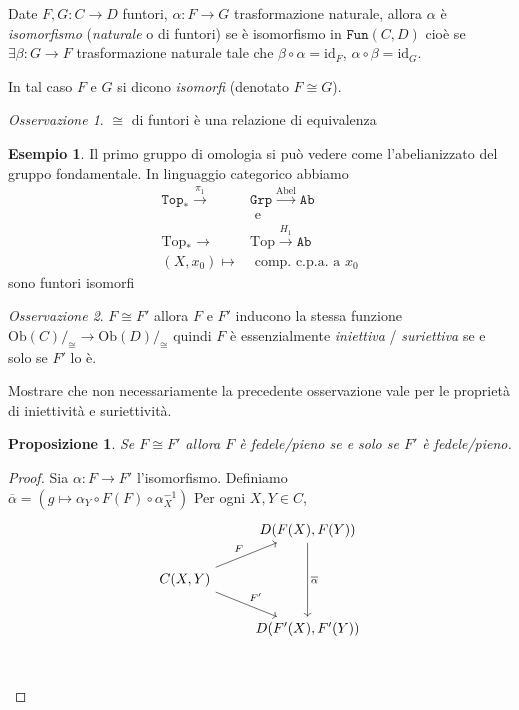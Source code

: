 \documentclass[notitlepage]{report}
\newcounter{theo}[section]\setcounter{theo}{0}
\newcounter{excounter}[section]\setcounter{excounter}{0}
\numberwithin{equation}{section}
\theoremstyle{plain}
\newtheorem{proposition}[theo]{Proposizione}
\theoremstyle{definition}
\newtheorem{example}[excounter]{Esempio}
\theoremstyle{remark}
\newtheorem*{remark}{Osservazione}
\begin{document}
\begin{definition}{}
    Date \(F, G : C \to D\) funtori, \(\alpha : F \to G\) trasformazione
    naturale, allora \(\alpha\) è \emph{isomorfismo} (\emph{naturale} o di funtori) se è isomorfismo in \(\mathtt{Fun}{(C, D)}\) cioè se 
    \(\exists \beta : G \to F\) trasformazione naturale tale che \(\beta \circ
    \alpha = \mathrm{id}_F\), \(\alpha \circ \beta = \mathrm{id}_G\).

    In tal caso \(F\) e \(G\) si dicono \emph{isomorfi} (denotato \(F \cong
    G\)).
\end{definition}
\begin{remark}{}
    \(\cong\) di funtori è una relazione di equivalenza 
\end{remark}
\begin{example}{}

Il primo gruppo di omologia si può vedere come l'abelianizzato del gruppo
fondamentale. In linguaggio categorico abbiamo 
\begin{align*}
  \mathtt{Top_*} \overset{\pi_{1}}{\to } &\mathtt{Grp} \overset{\mathrm{Abel}}{\to } \mathtt{Ab} \\ 
  &\text{ e } \\
  \mathrm{Top_*} \to &\mathrm{Top} \overset{H_{1}}{\to } \mathtt{Ab} \\
  {(X, x_{0})} \mapsto &\text{ comp. c.p.a. a \(x_{0}\)}
\end{align*}
sono funtori isomorfi
\end{example}

\begin{remark}{}
    \(F \cong F'\) allora \(F\) e \(F'\) inducono la stessa funzione \(\mathrm{Ob}{(C)} /_{\cong} \to \mathrm{Ob}{(D)}/_{\cong}\) quindi \(F\) è essenzialmente 
   \emph{iniettiva} / \emph{suriettiva} se e solo se \(F'\) lo è.
\end{remark}

\begin{eser}{}
    Mostrare che non necessariamente la precedente osservazione vale per le
    proprietà di iniettività e suriettività.
\end{eser}

\begin{proposition}{}
    Se \(F \cong F'\) allora \(F\) è \emph{fedele}/\emph{pieno} se e solo se \(F'\) è \emph{fedele}/\emph{pieno}.
\end{proposition}
\begin{proof}{}
    Sia \(\alpha : F \to F'\) l'isomorfismo. Definiamo \\\(\overline{\alpha} = {(g \mapsto \alpha_Y \circ F{(F)} \circ \alpha_X^{-1})}\) 
    Per ogni \(X, Y \in C\),
\[\begin{tikzcd}
	& {D(F(X),F(Y))} \\
	{C(X,Y)} \\
	& {D(F'(X),F'(Y))} \\
	\arrow["{\overline{\alpha}}", from=1-2, to=3-2]
	\arrow["F", from=2-1, to=1-2]
	\arrow["{F'}", from=2-1, to=3-2]
\end{tikzcd}\]
\end{proof}
\end{document}
